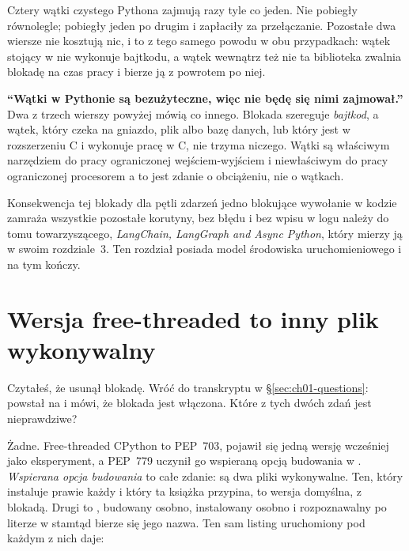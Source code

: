 \noindent
Cztery wątki czystego Pythona zajmują  razy tyle
co jeden. Nie pobiegły równolegle; pobiegły jeden po drugim i zapłaciły za
przełączanie. Pozostałe dwa wiersze nie kosztują nic, i to z tego samego
powodu w obu przypadkach: wątek stojący w  nie wykonuje bajtkodu,
a wątek wewnątrz  też nie \dash{} ta biblioteka zwalnia blokadę
na czas pracy i bierze ją z powrotem po niej.


\begin{trapbox}
\textbf{\enquote{Wątki w Pythonie są bezużyteczne, więc nie będę się nimi
zajmował.}} Dwa z trzech wierszy powyżej mówią co innego. Blokada szereguje
\emph{bajtkod}, a wątek, który czeka na gniazdo, plik albo bazę danych, lub
który jest w rozszerzeniu C i wykonuje pracę w C, nie trzyma niczego. Wątki
są właściwym narzędziem do pracy ograniczonej wejściem-wyjściem i
niewłaściwym do pracy ograniczonej procesorem \dash{} a to jest zdanie o
obciążeniu, nie o wątkach.
\end{trapbox}

\begin{note}
Konsekwencja tej blokady dla pętli zdarzeń \dash{} jedno blokujące wywołanie
w kodzie  zamraża wszystkie pozostałe korutyny, bez błędu i bez
wpisu w logu \dash{} należy do tomu towarzyszącego, \emph{LangChain,
LangGraph and Async Python}, który mierzy ją w swoim rozdziale~3. Ten
rozdział posiada model środowiska uruchomieniowego i na tym kończy.
\end{note}

\section{Wersja free-threaded to inny plik wykonywalny}
\label{sec:ch01-freethreaded}

\noindent
Czytałeś, że \pyver{} usunął blokadę. Wróć do transkryptu w
\S\ref{sec:ch01-questions}: powstał na \pypatch{} i mówi, że blokada jest
włączona. Które z tych dwóch zdań jest nieprawdziwe?

\medskip
\noindent
Żadne. Free-threaded CPython to PEP~703, pojawił się jedną wersję wcześniej
jako eksperyment, a PEP~779 uczynił go wspieraną opcją budowania w
\pyver{}. \emph{Wspierana opcja budowania} to całe zdanie: są dwa pliki
wykonywalne. Ten, który instaluje prawie każdy i który ta książka przypina,
to wersja domyślna, z blokadą. Drugi to , budowany
osobno, instalowany osobno i rozpoznawalny po literze  w
 \dash{} stamtąd bierze się jego nazwa. Ten sam listing
uruchomiony pod każdym z nich daje:

